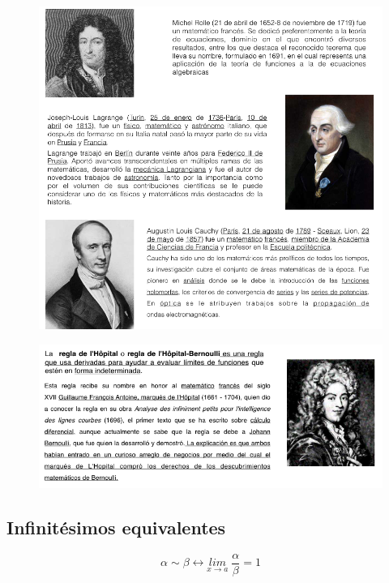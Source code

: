 		\begin{figure}[]
			\centering
			\includegraphics[width=1\textwidth]{imagenes/imagenes05/T05IM44.png}
		\end{figure}
		
		\begin{figure}[]
			\centering
			\includegraphics[width=1\textwidth]{imagenes/imagenes05/T05IM45.png}
		\end{figure}
		
		\subsection{Infinitésimos equivalentes}
		
		\begin{equation*}
		\alpha \sim \beta \leftrightarrow \underset {x\to a}{lim}\; {\dfrac {\alpha}{\beta}} = 1
		\end{equation*}
		
